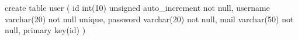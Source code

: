 create table user (
id int(10) unsigned auto_increment not null,
username varchar(20) not null unique,
password varchar(20) not null,
mail varchar(50) not null,
primary key(id)
)